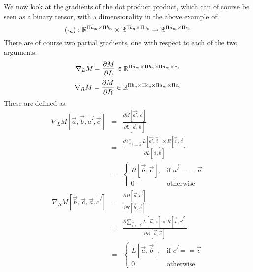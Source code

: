 \documentclass{article}
\begin{document}
  
  We now look at the gradients of the dot product product,
  which can of course be seen as a binary tensor,
  with a dimensionality in the above example of:
  \[ (\cdot_n): \mathbb{R}^{\Pi a_m \times \Pi b_n} 
                \times 
                \mathbb{R}^{\Pi b_n \times \Pi c_o}
                \rightarrow
                \mathbb{R}^{\Pi a_m \times \Pi c_o}
  \]
  There are of course two partial gradients, 
  one with respect to each of the two arguments:
  \[ \nabla_L M = \frac{\partial M}
                       {\partial L}
                \in \mathbb{R}^{\Pi a_m \times \Pi b_n \times 
                        \Pi a_m \times c_o           }
  \]
  \[ \nabla_R M = \frac{\partial M}
                       {\partial R}
                \in \mathbb{R}^{\Pi b_n \times \Pi c_o \times
                        \Pi a_m \times \Pi c_o       }
  \]
  These are defined as:
  \begin{eqnarray*}
    \nabla_L M[\overrightarrow{a}, 
               \overrightarrow{b},
               \overrightarrow{a'},
               \overrightarrow{c}]
    & = & \frac{\partial M[\overrightarrow{a'}, 
                           \overrightarrow{c}]}
               {\partial L[\overrightarrow{a},
                           \overrightarrow{b}]} \\
    & = & \frac{\partial 
                \sum_{\overrightarrow{i} \leftarrow \overrightarrow{b}}
                     {L[\overrightarrow{a'}, \overrightarrow{i}] 
                      \times R[\overrightarrow{i}, \overrightarrow{c}]
                     }}
               {\partial L[\overrightarrow{a},
                           \overrightarrow{b}]} \\
    & = & \begin{cases}
            R[\overrightarrow{b}, \overrightarrow{c}], 
               & \text{if } \overrightarrow{a'} == \overrightarrow{a} \\
            0  & \text{otherwise}
          \end{cases}
  \end{eqnarray*}
  \begin{eqnarray*}
    \nabla_R M[\overrightarrow{b}, 
               \overrightarrow{c},
               \overrightarrow{a},
               \overrightarrow{c'}]
    & = & \frac{\partial M[\overrightarrow{a}, 
                           \overrightarrow{c'}]}
               {\partial R[\overrightarrow{b},
                           \overrightarrow{c}]} \\
    & = & \frac{\partial 
                \sum_{\overrightarrow{i} \leftarrow \overrightarrow{b}}
                     {L[\overrightarrow{a}, \overrightarrow{i}] 
                      \times R[\overrightarrow{i}, \overrightarrow{c'}]
                     }}
               {\partial R[\overrightarrow{b},
                           \overrightarrow{c}]} \\
    & = & \begin{cases}
            L[\overrightarrow{a}, \overrightarrow{b}], 
               & \text{if } \overrightarrow{c'} == \overrightarrow{c} \\
            0  & \text{otherwise}
          \end{cases}
  \end{eqnarray*}
  
\end{document}
